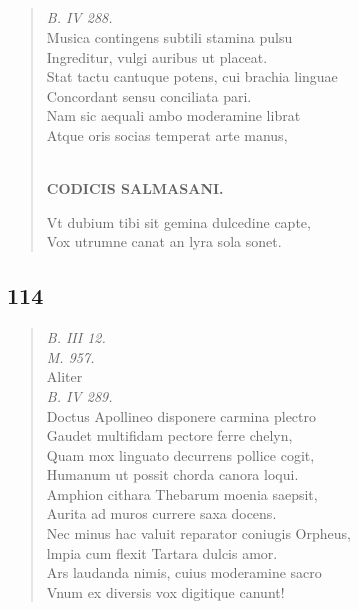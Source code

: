 \documentclass[11pt, a4paper]{report}
\begin{document}
            \subsection*{}
      \begin{verse}
      \textit{B. IV 288.} \\ Musica contingens subtili stamina pulsu \\ Ingreditur, vulgi auribus ut placeat. \\ Stat tactu cantuque potens, cui brachia linguae \\ Concordant sensu conciliata pari. \\ Nam sic aequali ambo moderamine librat \\ Atque oris socias temperat arte manus, \\ 
        ﻿\pagebreak 
    \begin{center} \textbf{CODICIS SALMASANI.} \end{center}Vt dubium tibi sit gemina dulcedine capte, \\ Vox utrumne canat an lyra sola sonet. \\ 
      \end{verse}
  
            \subsection*{114}
      \begin{verse}
      \textit{B. III 12.} \\ \textit{M. 957.} \\ Aliter \\ \textit{B. IV 289.} \\ Doctus Apollineo disponere carmina plectro \\ Gaudet multifidam pectore ferre chelyn, \\ Quam mox linguato decurrens pollice cogit, \\ Humanum ut possit chorda canora loqui. \\ Amphion cithara Thebarum moenia saepsit, \\ Aurita ad muros currere saxa docens. \\ Nec minus hac valuit reparator coniugis Orpheus, \\ lmpia cum flexit Tartara dulcis amor. \\ Ars laudanda nimis, cuius moderamine sacro \\ Vnum ex diversis vox digitique canunt! \\ 
      \end{verse}
  
\end{document}
